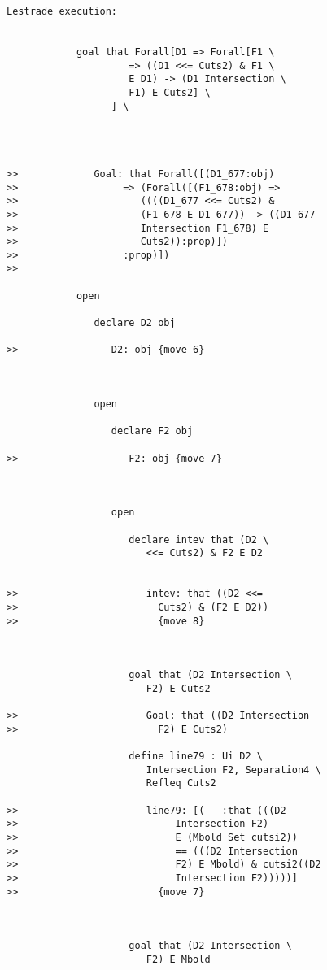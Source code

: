 \documentclass[12pt]{article}
\begin{document}
\begin{verbatim}Lestrade execution:


            goal that Forall[D1 => Forall[F1 \
                     => ((D1 <<= Cuts2) & F1 \
                     E D1) -> (D1 Intersection \
                     F1) E Cuts2] \
                  ] \
               



>>             Goal: that Forall([(D1_677:obj)
>>                  => (Forall([(F1_678:obj) =>
>>                     ((((D1_677 <<= Cuts2) &
>>                     (F1_678 E D1_677)) -> ((D1_677
>>                     Intersection F1_678) E
>>                     Cuts2)):prop)])
>>                  :prop)])
>>               

            open

               declare D2 obj

>>                D2: obj {move 6}



               open

                  declare F2 obj

>>                   F2: obj {move 7}



                  open

                     declare intev that (D2 \
                        <<= Cuts2) & F2 E D2


>>                      intev: that ((D2 <<=
>>                        Cuts2) & (F2 E D2))
>>                        {move 8}



                     goal that (D2 Intersection \
                        F2) E Cuts2

>>                      Goal: that ((D2 Intersection
>>                        F2) E Cuts2)

                     define line79 : Ui D2 \
                        Intersection F2, Separation4 \
                        Refleq Cuts2

>>                      line79: [(---:that (((D2
>>                           Intersection F2)
>>                           E (Mbold Set cutsi2))
>>                           == (((D2 Intersection
>>                           F2) E Mbold) & cutsi2((D2
>>                           Intersection F2)))))]
>>                        {move 7}



                     goal that (D2 Intersection \
                        F2) E Mbold


\end{verbatim}
\end{document}
